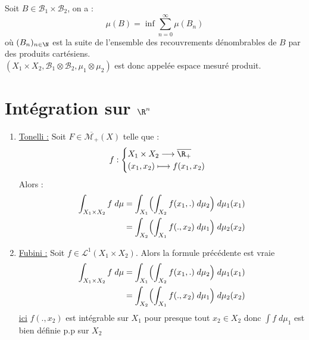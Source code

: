 \newpage 

\begin{definition}
    Soit $ B \in \mathcal{B}_1 \times \mathcal{B}_2$, on a :
        \[ \mu(B) = \inf \sum_{n=0}^{\infty} \mu (B_n) \] 
    où $(B_n)_{n \in \N}$ est la suite de l'ensemble des recouvrements dénombrables de $B$ par des produits cartésiens. \\
    $(X_1 \times X_2,\mathcal{B}_1 \otimes \mathcal{B}_2,\mu_1 \otimes \mu_2)$ est donc appelée espace mesuré produit. 
\end{definition}

\section{Intégration sur $\R^n$}

\begin{theorem}
    \begin{enumerate}
        \item \underline{Tonelli :} Soit $F \in \overline{\mathcal{M}_+}(X)$ telle que :
            \[ f :
                \begin{cases}
                    X_1 \times X_2 \longrightarrow \overline{\R_+} \\ 
                    (x_1,x_2) \longmapsto f(x_1,x_2)
                \end{cases} \] 
            Alors :
                \begin{align*}
                    \int_{X_1 \times X_2} f \; d \mu    &= \int_{X_1} \Bigl( \int_{X_2} f(x_1,.) \; d \mu_2 \Bigr) \; d \mu_1(x_1) \\
                                                        &= \int_{X_2} \Bigl( \int_{X_1} f(.,x_2) \; d \mu_1 \Bigr) \; d \mu_2(x_2)
                \end{align*}
        \item \underline{Fubini :} Soit $f \in \mathcal{L}^1(X_1 \times X_2)$. Alors la formule précédente est vraie 
                \begin{align*}
                    \int_{X_1 \times X_2} f \; d \mu    &= \int_{X_1} \Bigl( \int_{X_2} f(x_1,.) \; d \mu_2 \Bigr) \; d \mu_1(x_1) \\
                                                        &= \int_{X_2} \Bigl( \int_{X_1} f(.,x_2) \; d \mu_1 \Bigr) \; d \mu_2(x_2)
                \end{align*}
                \underline{ici} $f(.,x_2)$ est intégrable sur $X_1$ pour presque tout $x_2 \in X_2$ donc $\int f \; d \mu_1$ est bien définie p.p sur $X_2$
    \end{enumerate}
\end{theorem}

